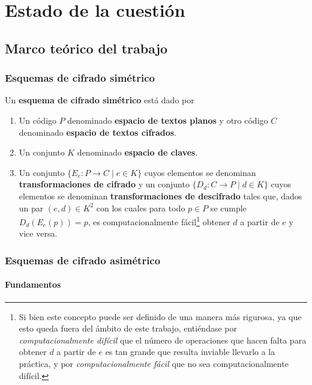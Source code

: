 \chapter{Estado de la cuestión}  

\section{Marco teórico del trabajo}

\subsection{Esquemas de cifrado simétrico}

\begin{definition}
	Un \textbf{esquema de cifrado simétrico} está dado por
	\begin{enumerate}
		\item Un código $P$ denominado \textbf{espacio de textos planos} y otro código $C$ denominado \textbf{espacio de textos cifrados}.
		\item Un conjunto $K$ denominado \textbf{espacio de claves}.
		\item Un conjunto $\{E_e : P \rightarrow C \mid e \in K\}$ cuyos elementos se denominan \textbf{transformaciones de cifrado} y un conjunto $\{D_d : C \rightarrow P \mid d \in K\}$ cuyos elementos se denominan \textbf{transformaciones de descifrado} tales que, dados un par $(e, d) \in K^2$ con los cuales para todo $p \in P$ se cumple $D_d(E_e(p)) = p$, es computacionalmente fácil\footnote{Si bien este concepto puede ser definido de una manera más rigurosa, ya que esto queda fuera del ámbito de este trabajo, entiéndase por \textit{computacionalmente difícil} que el número de operaciones que hacen falta para obtener $d$ a partir de $e$ es tan grande que resulta inviable llevarlo a la práctica, y por \textit{computacionalmente fácil} que no sea computacionalmente difícil.} obtener $d$ a partir de $e$ y vice versa.
	\end{enumerate}
\end{definition}

\subsection{Esquemas de cifrado asimétrico}

\subsubsection{Fundamentos}

